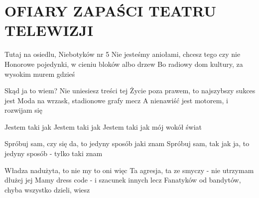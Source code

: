 \documentclass[../../../songbook.tex]{subfiles}
\begin{document}
\TabPositions{11cm} %
\section*{OFIARY ZAPAŚCI TEATRU TELEWIZJI}
{}
\vspace{0.5cm}
Tutaj na osiedlu, Niebotyków nr 5					 \newline
Nie jesteśmy aniołami, chcesz tego czy nie			 \newline
Honorowe pojedynki, w cieniu bloków albo drzew		 \newline
Bo radiowy dom kultury, za wysokim murem gdzieś		 \newline

Skąd ja to wiem? Nie uniesiesz treści tej	 \newline
Życie poza prawem, to najszybszy sukces jest	 \newline
Moda na wrzask, stadionowe grafy mecz	 \newline
A nienawiść jest motorem, i rozwijam się	 \newline

Jestem taki jak						 \newline
Jestem taki jak						 \newline
Jestem taki jak mój wokół świat		 \newline

\-\hspace{1cm} Spróbuj sam, czy się da, to jedyny sposób jaki znam				 \newline
\-\hspace{1cm} Spróbuj sam, tak jak ja, to jedyny sposób - tylko taki znam		 \newline

Władza nadużyta, to nie my to oni więc	 \newline
Ta agresja, ta ze smyczy - nie utrzymam dłużej jej	 \newline
Mamy dress code - i szacunek innych lecz	 \newline
Fanatyków od bandytów, chyba wszystko dzieli, wiesz	 \newline
\end{document}

